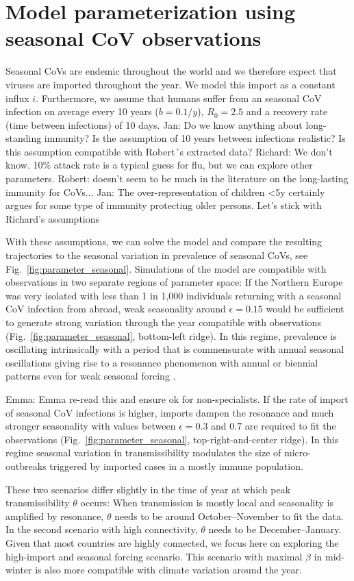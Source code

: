 \documentclass[rmp, reprint, superscriptaddress, floatfix,amsmath]{revtex4-1}
\newcommand{\Richard}[1]{{\color{drab}Richard: #1}}
\newcommand{\Robert}[1]{{\color{celestialblue}Robert: #1}}
\newcommand{\Jan}[1]{{\color{deepsaffron}Jan: #1}}
\newcommand{\Emma}[1]{{\color{purple}Emma: #1}}
\begin{document}
\section{Model parameterization using seasonal CoV observations}
Seasonal CoVs are endemic throughout the world and we therefore expect that viruses are imported throughout the year. 
We model this import as a constant influx $i$. 
Furthermore, we assume that humans suffer from an seasonal CoV infection on average every 10 years ($b=0.1/y$), $R_0=2.5$ and a recovery rate (time between infections) of 10 days.
\Jan{Do we know anything about long-standing immunity? Is the assumption of 10 years between infections realistic? Is this assumption compatible with Robert´s extracted data?}
\Richard{We don't know. 10\% attack rate is a typical guess for flu, but we can explore other parameters.}
\Robert{doesn't seem to be much in the literature on the long-lasting immunity for CoVs...}
\Jan{The over-representation of children <5y certainly argues for some type of immunity protecting older persons. Let's stick with Richard's assumptions}

With these assumptions, we can solve the model and compare the resulting trajectories to the seasonal variation in prevalence of seasonal CoVs, see Fig.~\ref{fig:parameter_seasonal}.
Simulations of the model are compatible with observations in two separate regions of parameter space: If the Northern Europe was very isolated with less than 1 in 1,000 individuals returning with a seasonal CoV infection from abroad, weak seasonality around $\epsilon=0.15$ would be sufficient to generate strong variation through the year compatible with observations (Fig.~\ref{fig:parameter_seasonal}, bottom-left ridge).
In this regime, prevalence is oscillating intrinsically with a period that is commensurate with annual seasonal oscillations giving rise to a resonance phenomenon with annual or biennial patterns even for weak seasonal forcing \citep{dushoff_dynamical_2004,chen_regular_2017}.

\Emma{Emma re-read this and ensure ok for non-specialists.}
If the rate of import of seasonal CoV infections is higher, imports dampen the resonance and much stronger seasonality with values between $\epsilon=0.3$ and $0.7$ are required to fit the observations (Fig.~\ref{fig:parameter_seasonal}, top-right-and-center ridge).
In this regime seasonal variation in transmissibility modulates the size of micro-outbreaks triggered by imported cases in a mostly immune population. 

These two scenarios differ slightly in the time of year at which peak transmissibility $\theta$ occurs: 
When transmission is mostly local and seasonality is amplified by resonance, $\theta$ needs to be around October--November to fit the data. 
In the second scenario with high connectivity, $\theta$ needs to be December--January. 
Given that most countries are highly connected, we focus here on exploring the high-import and seasonal forcing scenario.
This scenario with maximal $\beta$ in mid-winter is also more compatible with climate variation around the year.
\end{document}
